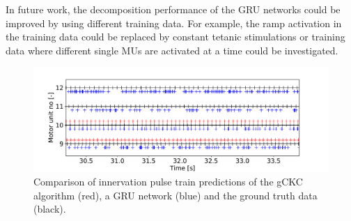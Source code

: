 In future work, the decomposition performance of the GRU networks could be improved by using different training data. For example, the ramp activation in the training data could be replaced by constant tetanic stimulations or training data where different single MUs are activated at a time could be investigated.

\begin{figure}
  \centering%
  \includegraphics[width=\textwidth]{images/results/application/gru2.pdf}%
  \caption{Comparison of innervation pulse train predictions of the gCKC algorithm (red), a GRU network (blue) and the ground truth data (black).}%
  \label{fig:gru_result}%
\end{figure}


